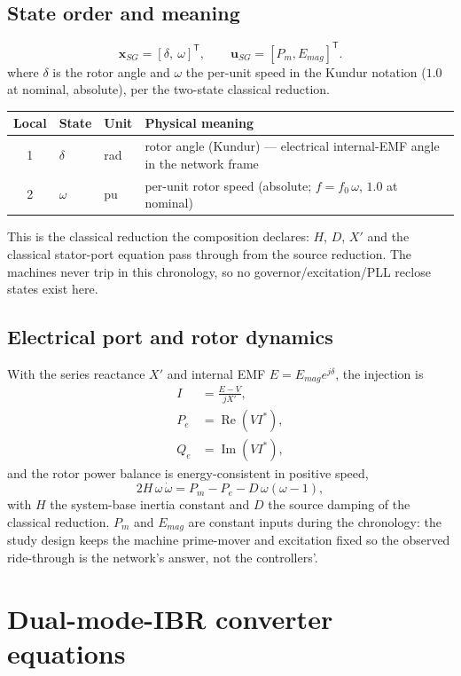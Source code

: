 \documentclass[12pt,a4paper]{article}
\newcommand{\vect}[1]{\boldsymbol{#1}}
\begin{document}
\subsection{State order and meaning}

\[
\vect x_{SG}=[\delta,\ \omega]^{\mathsf T},
\qquad \vect u_{SG}=[P_m,E_{mag}]^{\mathsf T}.
\]
where $\delta$ is the rotor angle and $\omega$ the per-unit speed in the Kundur
notation ($1.0$ at nominal, absolute), per the two-state classical reduction.
\begin{center}\footnotesize
\begin{tabularx}{\textwidth}{c l l X}
\toprule
Local & State & Unit & Physical meaning\\\midrule
1 & $\delta$ & rad & rotor angle (Kundur) --- electrical internal-EMF angle in the network frame\\
2 & $\omega$ & pu & per-unit rotor speed (absolute; $f=f_0\,\omega$, $1.0$ at nominal)\\
\bottomrule
\end{tabularx}
\end{center}
This is the classical reduction the composition declares: $H$, $D$, $X'$ and the
classical stator-port equation pass through from the source reduction.  The
machines never trip in this chronology, so no governor/excitation/PLL reclose
states exist here.

\subsection{Electrical port and rotor dynamics}

With the series reactance $X'$ and internal EMF
$E=E_{mag}e^{j\delta}$, the injection is
\begin{align}
I&=\frac{E-V}{jX'},\\
P_e&=\operatorname{Re}(V I^*),\\
Q_e&=\operatorname{Im}(V I^*),
\end{align}
and the rotor power balance is energy-consistent in positive speed,
\[
2H\,\omega\,\dot\omega
   =P_m-P_e-D\,\omega(\omega-1),
\]
with $H$ the system-base inertia constant and $D$ the source damping of the
classical reduction.  $P_m$ and $E_{mag}$ are constant inputs during the
chronology: the study design keeps the machine prime-mover and excitation
fixed so the observed ride-through is the network's answer, not the
controllers'.

\section{Dual-mode-IBR converter equations}
\label{sec:ibr}
\end{document}
